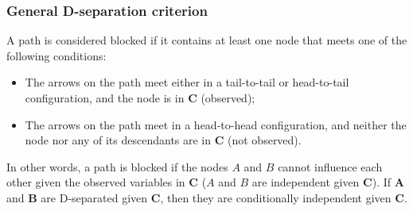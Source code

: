 \subsubsection{General D-separation criterion}
\begin{figure}[H]
\end{figure}
A path is considered blocked if it contains at least one node that meets one of the following conditions:
\begin{itemize}
    \item The arrows on the path meet either in a tail-to-tail or head-to-tail configuration, and the node is in $\boldsymbol{C}$ (observed);
    \item The arrows on the path meet in a head-to-head configuration, and neither the node nor any of its descendants are in $\boldsymbol{C}$ (not observed).
\end{itemize}
In other words, a path is blocked if the nodes $A$ and $B$ cannot influence each other given the observed variables in $\boldsymbol{C}$ ($A$ and $B$ are independent given $\boldsymbol{C}$).
If $\boldsymbol{A}$ and $\boldsymbol{B}$ are D-separated given $\boldsymbol{C}$, then they are conditionally independent given $\boldsymbol{C}$.

